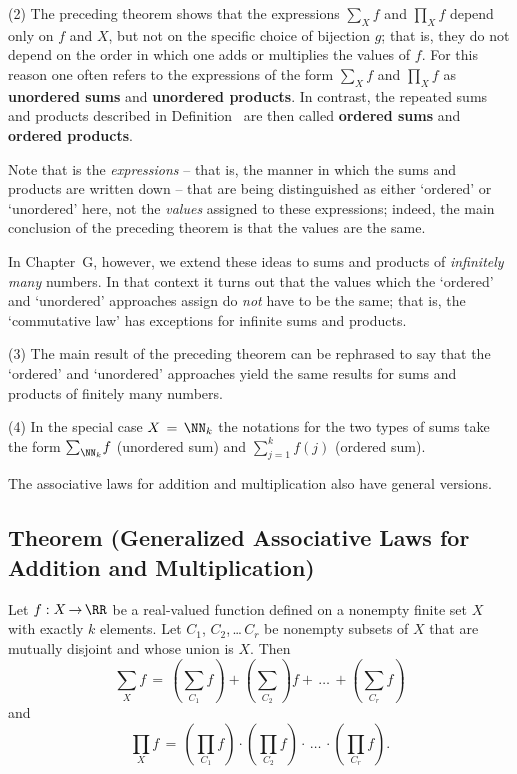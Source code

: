 {\V

        (2) The preceding theorem shows that the expressions ${\sum}_{X} f$ and ${\prod}_{X} f$ depend only on $f$ and $X$,
    but not on the specific choice of bijection $g$; that is, they do not depend on the order in which one adds or multiplies the values of $f$.
    For this reason one often refers to the expressions of the form ${\sum}_{X} f$ and ${\prod}_{X} f$ as {\bf unordered sums} and {\bf unordered products}.
    In contrast, the repeated sums and products described in Definition~ are then called {\bf ordered sums} and {\bf ordered products}.

        Note that is the {\em expressions} -- that is, the manner in which the sums and products are written down -- that are being distinguished as either `ordered' or `unordered' here, not the {\em values} assigned to these expressions;
    indeed, the main conclusion of the preceding theorem is that the values are the same.

        In Chapter~G, however, we extend these ideas to sums and products of {\em infinitely many} numbers.
    In that context it turns out that the values which the `ordered' and `unordered' approaches assign do {\em not} have to be the same;
    that is, the `commutative law' has exceptions for infinite sums and products.

\V

        (3) The main result of the preceding theorem can be rephrased to say that the
    `ordered' and `unordered' approaches yield the same results for sums and products of finitely many numbers.

\V

        (4) In the special case $X \,=\, {\NN}_{k}$ the notations for the two types of sums take the form ${\sum}_{{\NN}_{k}} f$ (unordered sum) and $\sum_{j=1}^{k} f(j)$ (ordered sum).

\V
\V

        The associative laws for addition and multiplication also have general versions.

\V

            \subsection{\small{\bf Theorem} (Generalized Associative Laws for Addition and Multiplication)}
            \label{ThmB10.60}

        Let $f:X \,{\rightarrow}\, {\RR}$ be a real-valued function defined on a nonempty finite set $X$ with exactly $k$ elements.
    Let $C_{1}$, $C_{2}$,\,{\ldots}\,$C_{r}$ be nonempty subsets of $X$ that are mutually disjoint and whose union is $X$.
    Then
        \begin{equation}
        \label{EqnB.20A}
        {\sum}_{X} f \,=\, ({\sum}_{C_{1}} f) + ({\sum}_{C_{2}}) f + \,{\ldots}\, + ({\sum}_{C_{r}} f)
        \end{equation}
    and
        \begin{equation}
        \label{EqnB.20B}
        {\prod}_{X} f \,=\, ({\prod}_{C_{1}} f){\cdot}({\prod}_{C_{2}} f){\cdot}\,{\ldots}\,{\cdot}({\prod}_{C_{r}} f).
        \end{equation}
 
}
